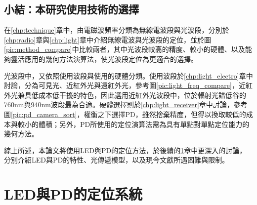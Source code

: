                 


        
                

        \subsection{小結：本研究使用技術的選擇}
        

        在\ref{chp:technique}章中，由電磁波頻率分類為無線電波段與光波段，分別於\ref{chp:radio}章與\ref{chp:light}章中介紹無線電波與光波段的定位，並於圖\ref{pic:method_compare}中比較兩者，其中光波段較高的精度、較小的硬體、以及能夠靈活應用的幾何方法演算法，使光波段定位為更適合的選擇。

        光波段中，又依照使用波段與使用的硬體分類。使用波段於\ref{chp:light_electro}章中討論，分為可見光、近紅外光與遠紅外光，參考圖\ref{pic:light_freq_compare}，近紅外光兼具低成本低干擾的特色，因此選用近紅外光波段中，位於輻射光譜低谷的760nm與940nm波段最為合適。硬體選擇則於\ref{chp:light_receiver}章中討論，參考圖\ref{pic:pd_camera_sort}，權衡之下選擇PD，雖然捨棄精度，但得以換取較低的成本與較小的體積；另外，PD所使用的定位演算法需為具有單點對單點定位能力的幾何方法。
    
        
        綜上所述，本論文將使用LED與PD的定位方法，於後續的\ref{chp:LEDandPD}章中更深入的討論，分別介紹LED與PD的特性、光傳遞模型，以及現今文獻所遇困難與限制。


        

    

        

        

        

        


        

        

            

          
\section{LED與PD的定位系統}
\label{chp:LEDandPD}




